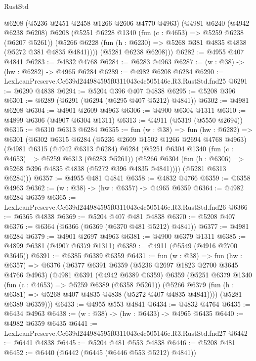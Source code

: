 \begin{lexlean}{RustStd}
\begin{coremodule}
      @6208
      (@5236 @2451 @2458 @1266 @2606 @4770 @4963)
      (@4981
        @6240
        (@4942 @6238 @6208)
        @6208
        (@5251
          @6228
          @1340
          (fun (c : @4653) => @5259 @6238 (@6207 @5261))
          (@5266 @6228 (fun (h : @6230) => @5268 @381 @4835 @4838 (@5272 @381 @4835 @4841))))
        (@5281 @6238 @6208)))
@6282 := @4955 @407 @4841
@6283 := @4832 @4768
@6284 := @6283 @4963
@6287 := (w : @38) -> (hw : @6282) -> @4965 @6284
@6289 := @4982 @6208 @6284
@6290 := LexLeanPreserve.Cc639d244984595f0311043c4c505146e.R3.RustStd.fnd25
@6291 := @6290 @4838
@6294 := @5204 @396 @407 @4838
@6295 := @5208 @396
@6301 := @6289 (@6291 (@6294 (@6295 @407 @5212) @4841))
@6302 := @4981 @6208
@6304 := @4901 @2609 @4963
@6306 := @4900 @6304 @1311
@6310 := @4899 @6306 (@4907 @6304 @1311)
@6313 := @4911 (@5319 (@5550 @2694))
@6315 := @6310 @6313 @6284
@6355 := fun (w : @38) =>
  fun (hw : @6282) =>
  @6301
    (@6302
      @6315
      @6284
      (@5236 @2609 @1502 @1266 @2694 @4768 @4963)
      (@4981
        @6315
        (@4942 @6313 @6284)
        @6284
        (@5251
          @6304
          @1340
          (fun (c : @4653) => @5259 @6313 (@6283 @5261))
          (@5266 @6304 (fun (h : @6306) => @5268 @396 @4835 @4838 (@5272 @396 @4835 @4841))))
        (@5281 @6313 @6284)))
@6357 := @4955 @481 @4841
@6358 := @4832 @4766
@6359 := @6358 @4963
@6362 := (w : @38) -> (hw : @6357) -> @4965 @6359
@6364 := @4982 @6284 @6359
@6365 := LexLeanPreserve.Cc639d244984595f0311043c4c505146e.R3.RustStd.fnd26
@6366 := @6365 @4838
@6369 := @5204 @407 @481 @4838
@6370 := @5208 @407
@6376 := @6364 (@6366 (@6369 (@6370 @481 @5212) @4841))
@6377 := @4981 @6284
@6379 := @4901 @2697 @4963
@6381 := @4900 @6379 @1311
@6385 := @4899 @6381 (@4907 @6379 @1311)
@6389 := @4911 (@5549 (@4916 @2700 @3645))
@6391 := @6385 @6389 @6359
@6431 := fun (w : @38) =>
  fun (hw : @6357) =>
  @6376
    (@6377
      @6391
      @6359
      (@5236 @2697 @1823 @2700 @3645 @4766 @4963)
      (@4981
        @6391
        (@4942 @6389 @6359)
        @6359
        (@5251
          @6379
          @1340
          (fun (c : @4653) => @5259 @6389 (@6358 @5261))
          (@5266 @6379 (fun (h : @6381) => @5268 @407 @4835 @4838 (@5272 @407 @4835 @4841))))
        (@5281 @6389 @6359)))
@6433 := @4955 @553 @4841
@6434 := @4832 @4764
@6435 := @6434 @4963
@6438 := (w : @38) -> (hw : @6433) -> @4965 @6435
@6440 := @4982 @6359 @6435
@6441 := LexLeanPreserve.Cc639d244984595f0311043c4c505146e.R3.RustStd.fnd27
@6442 := @6441 @4838
@6445 := @5204 @481 @553 @4838
@6446 := @5208 @481
@6452 := @6440 (@6442 (@6445 (@6446 @553 @5212) @4841))

\end{coremodule}
\end{lexlean}
